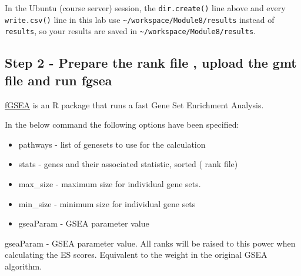 \documentclass[
]{book}
\providecommand{\tightlist}{%
  \setlength{\itemsep}{0pt}\setlength{\parskip}{0pt}}
\newenvironment{rmd-caution}{\begin{tcolorbox}[colback=orange!5,colframe=orange!75!black,title=Caution]}{\end{tcolorbox}}
\begin{document}
\begin{rmd-caution}
In the Ubuntu (course server) session, the \texttt{dir.create()} line
above and every \texttt{write.csv()} line in this lab use
\texttt{\textasciitilde{}/workspace/Module8/results} instead of
\texttt{results}, so your results are saved in
\texttt{\textasciitilde{}/workspace/Module8/results}.
\end{rmd-caution}

\subsection{Step 2 - Prepare the rank file , upload the gmt file and run fgsea}\label{step-2---prepare-the-rank-file-upload-the-gmt-file-and-run-fgsea}

\href{https://bioconductor.org/packages/release/bioc/html/fgsea.html}{fGSEA} is an R package that runs a fast Gene Set Enrichment Analysis.

In the below command the following options have been specified:

\begin{itemize}
\tightlist
\item
  pathways - list of genesets to use for the calculation
\item
  stats - genes and their associated statistic, sorted ( rank file)
\item
  max\_size - maximum size for individual gene sets.
\item
  min\_size - minimum size for individual gene sets
\item
  gseaParam - GSEA parameter value
\end{itemize}

\begin{rmd-caution}
gseaParam - GSEA parameter value. All ranks will be raised to this power
when calculating the ES scores. Equivalent to the weight in the original
GSEA algorithm.
\end{rmd-caution}
\end{document}
